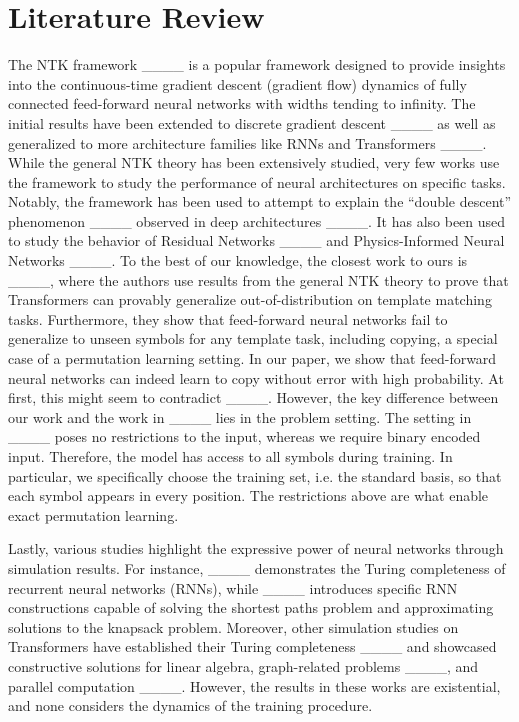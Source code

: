 \section{Literature Review}
The NTK framework ____ is a popular framework designed to provide insights into the continuous-time gradient descent (gradient flow) dynamics of fully connected feed-forward neural networks with widths tending to infinity. The initial results have been extended to discrete gradient descent ____ as well as generalized to more architecture families like RNNs and Transformers ____. While the general NTK theory has been extensively studied, very few works use the framework to study the performance of neural architectures on specific tasks. Notably, the framework has been used to attempt to explain the ``double descent'' phenomenon ____ observed in deep architectures ____. It has also been used to study the behavior of Residual Networks ____ and Physics-Informed Neural Networks ____. To the best of our knowledge, the closest work to ours is ____, where the authors use results from the general NTK theory to prove that Transformers can provably generalize out-of-distribution on template matching tasks. Furthermore, they show that feed-forward neural networks fail to generalize to unseen symbols for any template task, including copying, a special case of a permutation learning setting. In our paper, we show that feed-forward neural networks can indeed learn to copy without error with high probability. At first, this might seem to contradict ____. However, the key difference between our work and the work in ____ lies in the problem setting. The setting in ____ poses no restrictions to the input, whereas we require binary encoded input. Therefore, the model has access to all symbols during training. In particular, we specifically choose the training set, i.e. the standard basis, so that each symbol appears in every position. 
The restrictions above are what enable exact permutation learning.      

Lastly, various studies highlight the expressive power of neural networks through simulation results. For instance, ____ demonstrates the Turing completeness of recurrent neural networks (RNNs), while ____ introduces specific RNN constructions capable of solving the shortest paths problem and approximating solutions to the knapsack problem. Moreover, other simulation studies on Transformers have established their Turing completeness ____ and showcased constructive solutions for linear algebra, graph-related problems ____, and parallel computation ____. However, the results in these works are existential, and none considers the dynamics of the training procedure.